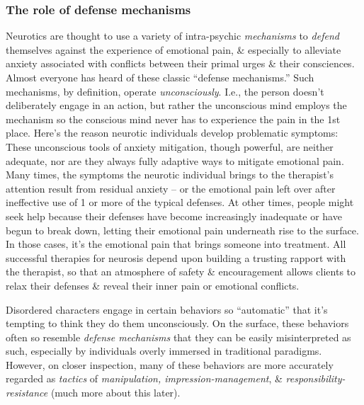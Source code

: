 \documentclass{article}
\numberwithin{equation}{section}
\begin{document}
\subsubsection{The role of defense mechanisms}
Neurotics are thought to use a variety of intra-psychic \textit{mechanisms} to \textit{defend} themselves against the experience of emotional pain, \& especially to alleviate anxiety associated with conflicts between their primal urges \& their consciences. Almost everyone has heard of these classic ``defense mechanisms.'' Such mechanisms, by definition, operate \textit{unconsciously}. I.e., the person doesn't deliberately engage in an action, but rather the unconscious mind employs the mechanism so the conscious mind never has to experience the pain in the 1st place. Here's the reason neurotic individuals develop problematic symptoms: These unconscious tools of anxiety mitigation, though powerful, are neither adequate, nor are they always fully adaptive ways to mitigate emotional pain. Many times, the symptoms the neurotic individual brings to the therapist's attention result from residual anxiety -- or the emotional pain left over after ineffective use of 1 or more of the typical defenses. At other times, people might seek help because their defenses have become increasingly inadequate or have begun to break down, letting their emotional pain underneath rise to the surface. In those cases, it's the emotional pain that brings someone into treatment. All successful therapies for neurosis depend upon building a trusting rapport with the therapist, so that an atmosphere of safety \& encouragement allows clients to relax their defenses \& reveal their inner pain or emotional conflicts.

Disordered characters engage in certain behaviors so ``automatic'' that it's tempting to think they do them unconsciously. On the surface, these behaviors often so resemble \textit{defense mechanisms} that they can be easily misinterpreted as such, especially by individuals overly immersed in traditional paradigms. However, on closer inspection, many of these behaviors are more accurately regarded as \textit{tactics} of \textit{manipulation, impression-management}, \& \textit{responsibility-resistance} (much more about this later).
\end{document}
